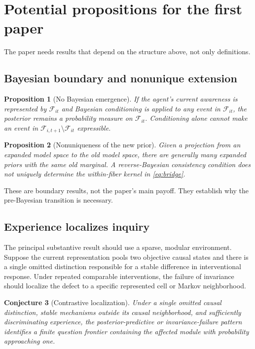 \documentclass[11pt]{article}
\newtheorem{proposition}{Proposition}[section]
\newtheorem{conjecture}[proposition]{Conjecture}
\newcommand{\F}{\mathcal{F}}
\begin{document}
	\section{Potential propositions for the first paper}
	
	The paper needs results that depend on the structure above, not only definitions.
	
	\subsection{Bayesian boundary and nonunique extension}
	
	\begin{proposition}[No Bayesian emergence]
		If the agent's current awareness is represented by $\F_{it}$ and Bayesian conditioning is applied to any event in $\F_{it}$, the posterior remains a probability measure on $\F_{it}$.  Conditioning alone cannot make an event in $\F_{i,t+1}\setminus\F_{it}$ expressible.
	\end{proposition}
	
	\begin{proposition}[Nonuniqueness of the new prior]
		Given a projection from an expanded model space to the old model space, there are generally many expanded priors with the same old marginal.  A reverse-Bayesian consistency condition does not uniquely determine the within-fiber kernel in \eqref{eq:bridge}.
	\end{proposition}
	
	These are boundary results, not the paper's main payoff.  They establish why the pre-Bayesian transition is necessary.
	
	\subsection{Experience localizes inquiry}
	
	The principal substantive result should use a sparse, modular environment.  Suppose the current representation pools two objective causal states and there is a single omitted distinction responsible for a stable difference in interventional response.  Under repeated comparable interventions, the failure of invariance should localize the defect to a specific represented cell or Markov neighborhood.
	
	\begin{conjecture}[Contrastive localization]
		Under a single omitted causal distinction, stable mechanisms outside its causal neighborhood, and sufficiently discriminating experience, the posterior-predictive or invariance-failure pattern identifies a finite question frontier containing the affected module with probability approaching one.
	\end{conjecture}
	
\end{document}
